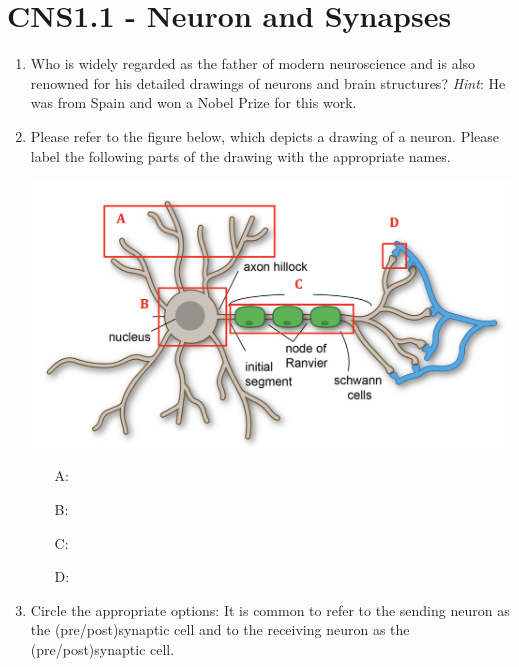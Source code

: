 \documentclass[11pt,letterpaper]{article}
\begin{document}
\maketitle
\thispagestyle{first}

\section{CNS1.1 - Neuron and Synapses} %
\begin{enumerate}
    \item Who is widely regarded as the father of modern neuroscience and is also renowned for his detailed drawings of neurons and brain structures? \emph{Hint}: He was from Spain and won a Nobel Prize for this work.
    \vspace{0.5in}
    
    \item Please refer to the figure below, which depicts a drawing of a neuron. Please label the following parts of the drawing with the appropriate names.
    \begin{center}
        \includegraphics[scale=0.4]{1.2.png}
    \end{center}
    \begin{enumerate}
        \item[A:]
        \item[B:]
        \item[C:]
        \item[D:]
    \end{enumerate}

    \item Circle the appropriate options: It is common to refer to the sending neuron as the (pre/post)synaptic cell and to the receiving neuron as the (pre/post)synaptic cell.
    
\end{enumerate}
\end{document}
